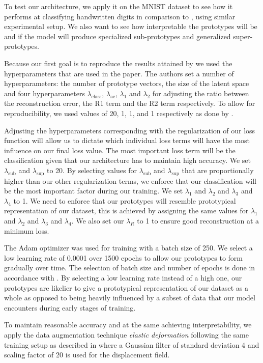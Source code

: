 To test our architecture, we apply it on the MNIST dataset to see how it performs at classifying handwritten digits in comparison to \cite{li2018deep}, using similar experimental setup. We also want to see how interpretable the prototypes will be and if the model will produce specialized sub-prototypes and generalized super-prototypes.

Because our first goal is to reproduce the results attained by  \cite{li2018deep} we used the hyperparameters that are used in the paper. The authors set a number of hyperparameters: the number of prototype vectors, the size of the latent space and four hyperparameters $\lambda_{\text{class}}$, $\lambda_{\text{ae}}$, $\lambda_1$ and $\lambda_2$ for adjusting the ratio between the reconstruction error, the R1 term and the R2 term respectively. To allow for reproducibility, we used values of 20, 1, 1, and 1 respectively as done by \cite{li2018deep}.

Adjusting the hyperparameters corresponding with the regularization of our loss function will allow us to dictate which individual loss terms will have the most influence on our final loss value. The most important loss term will be the classification given that our architecture has to maintain high accuracy. We set $\lambda_{\text{sub}}$ and $\lambda_{\text{sup}}$ to 20. By selecting values for $\lambda_{\text{sub}}$ and $\lambda_{\text{sup}}$ that are proportionally higher than our other regularization terms, we enforce that our classification will be the most important factor during our training. We set $\lambda_{1}$ and $\lambda_{2}$ and $\lambda_{3}$ and $\lambda_{4}$ to 1. We need to enforce that our prototypes will resemble prototypical representation of our dataset, this is achieved by assigning the same values for $\lambda_{1}$ and $\lambda_{2}$ and $\lambda_{3}$ and $\lambda_{4}$. We also set our $\lambda_{R}$ to 1 to ensure good reconstruction at a minimum loss. 

The Adam optimizer \cite{adam} was used for training with a batch size of 250. We select a low learning rate of 0.0001 over 1500 epochs to allow our prototypes to form gradually over time. The selection of batch size and number of epochs is done in accordance with \cite{li2018deep}. By selecting a low learning rate instead of a high one, our prototypes are likelier to give a prototypical representation of our dataset as a whole as opposed to being heavily influenced by a subset of data that our model encounters during early stages of training. 


To maintain reasonable accuracy and at the same achieving interpretability, we apply the data augmentation technique \textit{elastic deformation}\citep{elasticdeformation} following the same training setup as described in \citep{li2018deep} where a Gaussian filter of standard deviation 4 and scaling factor of 20 is used for the displacement field. 
